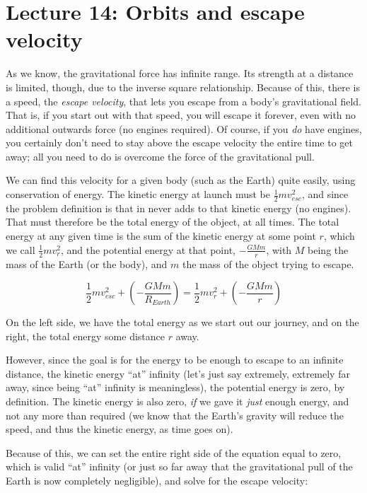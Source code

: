 \section{Lecture 14: Orbits and escape velocity}

As we know, the gravitational force has infinite range. Its strength at a distance is limited, though, due to the inverse square relationship. Because of this, there is a speed, the \emph{escape velocity}, that lets you escape from a body's gravitational field. That is, if you start out with that speed, you will escape it forever, even with no additional outwards force (no engines required). Of course, if you \emph{do} have engines, you certainly don't need to stay above the escape velocity the entire time to get away; all you need to do is overcome the force of the gravitational pull.

We can find this velocity for a given body (such as the Earth) quite easily, using conservation of energy. The kinetic energy at launch must be $\displaystyle \frac{1}{2} m v_{esc}^2$, and since the problem definition is that in never adds to that kinetic energy (no engines). That must therefore be the total energy of the object, at all times. The total energy at any given time is the sum of the kinetic energy at some point $r$, which we call $\displaystyle \frac{1}{2} m v_r^2$, and the potential energy at that point, $\displaystyle - \frac{G M m}{r}$, with $M$ being the mass of the Earth (or the body), and $m$ the mass of the object trying to escape.

\begin{equation}
\frac{1}{2} m v_{esc}^2 + \left(-\frac{G M m}{R_{Earth}}\right) = \frac{1}{2} m v_r^2 + \left(-\frac{G M m}{r}\right)
\end{equation}

On the left side, we have the total energy as we start out our journey, and on the right, the total energy some distance $r$ away.

However, since the goal is for the energy to be enough to escape to an infinite distance, the kinetic energy ``at'' infinity (let's just say extremely, extremely far away, since being ``at'' infinity is meaningless), the potential energy is zero, by definition. The kinetic energy is also zero, \emph{if} we gave it \emph{just} enough energy, and not any more than required (we know that the Earth's gravity will reduce the speed, and thus the kinetic energy, as time goes on).

Because of this, we can set the entire right side of the equation equal to zero, which is valid ``at'' infinity (or just so far away that the gravitational pull of the Earth is now completely negligible), and solve for the escape velocity:

